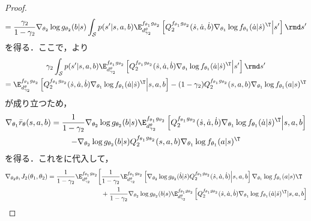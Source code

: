 \documentclass[a4paper,10pt,dvipdfmx]{jsarticle}
\begin{document}
\begin{proof}
\begin{align}
        =\dfrac{\gamma_2}{1-\gamma_2}\nabla_{\theta_2}\log g_{\theta_2}(b|s)
        \int_{\mathcal{S}}p(s'|s,a,b)\E_{d_{\gamma_2}^{\theta}}^{f_{\theta_1}g_{\theta_2}}\left[Q_2^{f_{\theta_1}g_{\theta_2}}(\dot{s},\dot{a},\dot{b})\nabla_{\theta_1}\log f_{\theta_1}(\dot{a}|\dot{s})^{\T}\middle|s'\right]\rmd s'\label{eq:nabla_1_r_bar}
    \end{align}
    を得る．ここで，より
    \begin{multline}
        \gamma_2\int_{\mathcal{S}}p(s'|s,a,b)\E_{d_{\gamma_2}^{\theta}}^{f_{\theta_1}g_{\theta_2}}\left[Q_2^{f_{\theta_1}g_{\theta_2}}(\dot{s},\dot{a},\dot{b})\nabla_{\theta_1}\log f_{\theta_1}(\dot{a}|\dot{s})^{\T}\middle|s'\right]\rmd s'\\
        =\E_{d_{\gamma_2}^{\theta}}^{f_{\theta_1}g_{\theta_2}}\left[Q_2^{f_{\theta_1}g_{\theta_2}}(\dot{s},\dot{a},\dot{b})\nabla_{\theta_1}\log f_{\theta_1}(\dot{a}|\dot{s})^{\T}\middle|s,a,b\right]-(1-\gamma_2)Q_2^{f_{\theta_1}g_{\theta_2}}(s,a,b)\nabla_{\theta_1}\log f_{\theta_1}(a|s)^{\T}
    \end{multline}
    が成り立つため，
    \begin{multline}
        \nabla_{\theta_1}\bar{r}_{\theta}(s,a,b)=\dfrac{1}{1-\gamma_2}\nabla_{\theta_2}\log g_{\theta_2}(b|s)\E_{d_{\gamma_2}^{\theta}}^{f_{\theta_1}g_{\theta_2}}\left[Q_2^{f_{\theta_1}g_{\theta_2}}(\dot{s},\dot{a},\dot{b})\nabla_{\theta_1}\log f_{\theta_1}(\dot{a}|\dot{s})^{\T}\middle|s,a,b\right]\\
        -\nabla_{\theta_2}\log g_{\theta_2}(b|s)Q_2^{f_{\theta_1}g_{\theta_2}}(s,a,b)\nabla_{\theta_1}\log f_{\theta_1}(a|s)^{\T}
    \end{multline}
    を得る．これをに代入して，
    \begin{align}
        \nabla_{\theta_2\theta_1}J_2(\theta_1,\theta_2)
        =\dfrac{1}{1-\gamma_2}\E_{d_{\gamma_2}^{\theta}}^{f_{\theta_1}g_{\theta_2}}\bigg[&\dfrac{1}{1-\gamma_2}\E_{d_{\gamma_2}^{\theta}}^{f_{\theta_1}g_{\theta_2}}\left[\nabla_{\theta_2}\log g_{\theta_2}(\dot{b}|\dot{s})Q_2^{f_{\theta_1}g_{\theta_2}}(\dot{s},\dot{a},\dot{b})\middle|s,a,b\right]\nabla_{\theta_1}\log f_{\theta_1}(a|s)\T\nonumber\\
        &+\dfrac{1}{1-\gamma_2}\nabla_{\theta_2}\log g_{\theta_2}(b|s)\E_{d_{\gamma_2}^{\theta}}^{f_{\theta_1}g_{\theta_2}}\left[Q_2^{f_{\theta_1}g_{\theta_2}}(\dot{s},\dot{a},\dot{b})\nabla_{\theta_1}\log f_{\theta_1}(\dot{a}|\dot{s})^{\T}|s,a,b\right]\nonumber\\

\end{align}
\end{proof}
\end{document}
